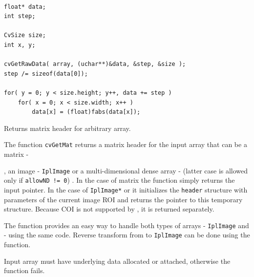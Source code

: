 \begin{lstlisting}

float* data;
int step;

CvSize size;
int x, y;

cvGetRawData( array, (uchar**)&data, &step, &size );
step /= sizeof(data[0]);

for( y = 0; y < size.height; y++, data += step )
    for( x = 0; x < size.width; x++ )
        data[x] = (float)fabs(data[x]);

\end{lstlisting}
\fi

\label{GetMat}

Returns matrix header for arbitrary array.


\begin{description}
\ifC
{}
\fi
\end{description}

The function \texttt{cvGetMat} returns a matrix header for the input array that can be a matrix - 

, an image - \texttt{IplImage} or a multi-dimensional dense array -  (latter case is allowed only if \texttt{allowND != 0}) . In the case of matrix the function simply returns the input pointer. In the case of \texttt{IplImage*} or  it initializes the \texttt{header} structure with parameters of the current image ROI and returns the pointer to this temporary structure. Because COI is not supported by , it is returned separately.

The function provides an easy way to handle both types of arrays - \texttt{IplImage} and  - using the same code. Reverse transform from  to \texttt{IplImage} can be done using the  function.

Input array must have underlying data allocated or attached, otherwise the function fails.

